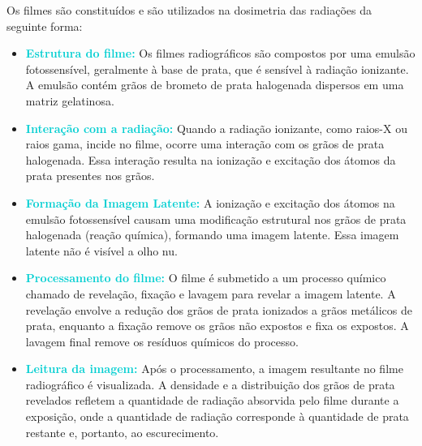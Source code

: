 \documentclass[11pt,a4paper]{article}
\begin{document}
 
	Os filmes são constituídos e são utilizados na dosimetria das radiações da seguinte forma:

		\begin{itemize}
			\item \textcolor{DarkTurquoise}{\textbf{Estrutura do filme:}} Os filmes radiográficos são compostos por uma emulsão fotossensível, geralmente à base de prata, que é sensível à radiação ionizante. A emulsão contém grãos de brometo de prata halogenada dispersos em uma matriz gelatinosa.
			\item \textcolor{DarkTurquoise}{\textbf{Interação com a radiação:}} Quando a radiação ionizante, como raios-X ou raios gama, incide no filme, ocorre uma interação com os grãos de prata halogenada. Essa interação resulta na ionização e excitação dos átomos da prata presentes nos grãos.
			\item \textcolor{DarkTurquoise}{\textbf{Formação da Imagem Latente:}} A ionização e excitação dos átomos na emulsão fotossensível causam uma modificação estrutural nos grãos de prata halogenada (reação química), formando uma imagem latente. Essa imagem latente não é visível a olho nu.
			\item \textcolor{DarkTurquoise}{\textbf{Processamento do filme:}} O filme é submetido a um processo químico chamado de revelação, fixação e lavagem para revelar a imagem latente. A revelação envolve a redução dos grãos de prata ionizados a grãos metálicos de prata, enquanto a fixação remove os grãos não expostos e fixa os expostos. A lavagem final remove os resíduos químicos do processo.
			\item \textcolor{DarkTurquoise}{\textbf{Leitura da imagem:}} Após o processamento, a imagem resultante no filme radiográfico é visualizada. A densidade e a distribuição dos grãos de prata revelados refletem a quantidade de radiação absorvida pelo filme durante a exposição, onde a quantidade de radiação corresponde à quantidade de prata restante e, portanto, ao escurecimento.
		\end{itemize}
\end{document}
